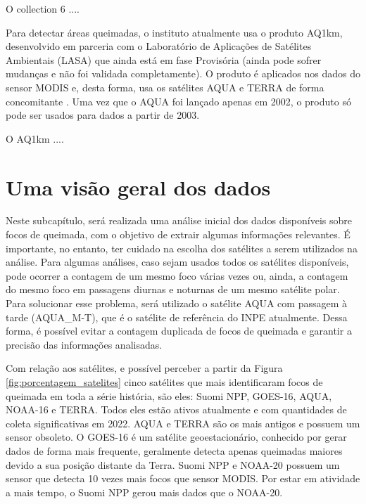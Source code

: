 \documentclass[cic,tc]{iiufrgs}
\begin{document}
O collection 6 .... \citep{GIGLIO2016} \par

Para detectar áreas queimadas, o instituto atualmente usa o produto AQ1km, 
desenvolvido em parceria com o Laboratório de Aplicações de Satélites Ambientais 
(LASA) \citep{SiteAQ1km} que ainda está em fase Provisória (ainda pode sofrer 
mudanças e não foi validada completamente). O produto é aplicados nos dados do 
sensor MODIS e, desta forma, usa os satélites AQUA e TERRA de forma 
concomitante \citep{libonati2015algorithm}. Uma vez que o AQUA foi lançado apenas 
em 2002, o produto só pode ser usados para dados a partir de 2003. \par

O AQ1km .... \citep{libonati2015algorithm} \par

\section{Uma visão geral dos dados}

Neste subcapítulo, será realizada uma análise inicial dos dados disponíveis sobre focos de queimada, com o objetivo de extrair algumas informações relevantes. É importante, no entanto, ter cuidado na escolha dos satélites a serem utilizados na análise. Para algumas análises, caso sejam usados todos os satélites disponíveis, pode ocorrer a contagem de um mesmo foco várias vezes ou, ainda, a contagem do mesmo foco em passagens diurnas e noturnas de um mesmo satélite polar. Para solucionar esse problema, será utilizado o satélite AQUA com passagem à tarde (AQUA\_M-T), que é  o satélite de referência do INPE atualmente. Dessa forma, é possível evitar a contagem duplicada de focos de queimada e garantir a precisão das informações analisadas. \par

Com relação aos satélites, e possível perceber a partir da Figura \ref{fig:porcentagem_satelites} cinco satélites que mais identificaram focos de queimada em toda a série história, são eles: Suomi NPP, GOES-16, AQUA, NOAA-16 e TERRA. Todos eles estão ativos atualmente e com quantidades de coleta significativas em 2022. AQUA e TERRA são os mais antigos e possuem um sensor obsoleto. O GOES-16 é um satélite geoestacionário, conhecido por gerar dados de forma mais frequente, geralmente detecta apenas queimadas maiores devido a sua posição distante da Terra. Suomi NPP e NOAA-20 possuem um sensor que detecta 10 vezes mais focos que sensor MODIS. Por estar em atividade a mais tempo, o Suomi NPP gerou mais dados que o NOAA-20. \par
\end{document}
